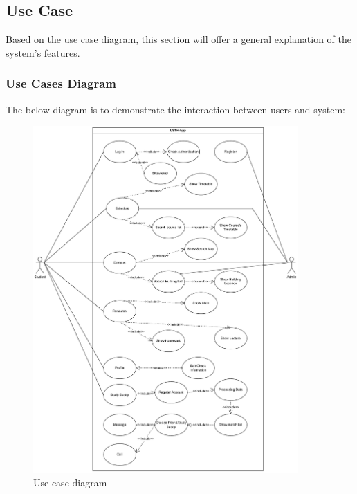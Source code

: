 \documentclass[12pt]{article}
\begin{document}
\pagebreak

\subsection{Use Case}
Based on the use case diagram, this section will offer a general explanation of the system's
features.

\subsubsection{Use Cases Diagram}
    The below diagram is to demonstrate the interaction between users and system:
    \begin{figure}[H]
        \centering
        \includegraphics[width=0.9\textwidth]{image/USTHConnect_usecase.pdf} 
        \caption{Use case diagram}
        \label{fig:usthconnect_use_case}
    \end{figure}

    \pagebreak
\end{document}
